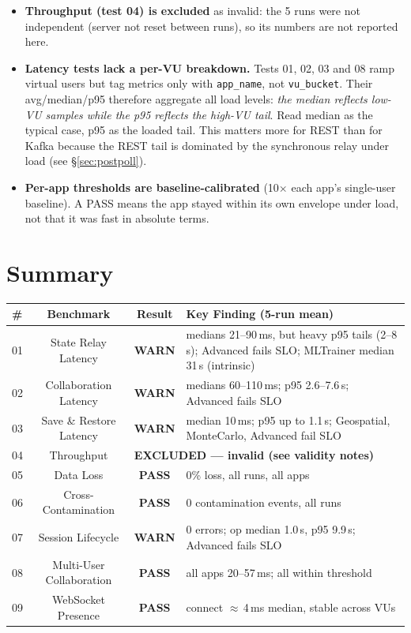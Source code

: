 \documentclass[11pt,a4paper]{article}
\newcommand{\pass}{\textcolor{pass}{\textbf{PASS}}}
\newcommand{\warn}{\textcolor{warn}{\textbf{WARN}}}
\begin{document}
\begin{itemize}
  \item \textbf{Throughput (test 04) is excluded} as invalid: the 5 runs were
        not independent (server not reset between runs), so its numbers are not
        reported here.
  \item \textbf{Latency tests lack a per-VU breakdown.} Tests 01, 02, 03 and
        08 ramp virtual users but tag metrics only with \texttt{app\_name},
        not \texttt{vu\_bucket}. Their avg/median/p95 therefore aggregate all
        load levels: \emph{the median reflects low-VU samples while the p95
        reflects the high-VU tail}. Read median as the typical case, p95 as the
        loaded tail. This matters more for REST than for Kafka because the REST
        tail is dominated by the synchronous relay under load (see
        \S\ref{sec:postpoll}).
  \item \textbf{Per-app thresholds are baseline-calibrated} (10$\times$ each
        app's single-user baseline). A PASS means the app stayed within its own
        envelope under load, not that it was fast in absolute terms.
\end{itemize}

\section{Summary}

\begin{tabularx}{\textwidth}{@{}lccX@{}}
\toprule
\textbf{\#} & \textbf{Benchmark} & \textbf{Result} & \textbf{Key Finding (5-run mean)} \\
\midrule
01 & State Relay Latency       & \warn & medians 21--90\,ms, but heavy p95 tails (2--8\,s); Advanced fails SLO; MLTrainer median 31\,s (intrinsic) \\
02 & Collaboration Latency     & \warn & medians 60--110\,ms; p95 2.6--7.6\,s; Advanced fails SLO \\
03 & Save \& Restore Latency   & \warn & median 10\,ms; p95 up to 1.1\,s; Geospatial, MonteCarlo, Advanced fail SLO \\
04 & Throughput                 & \multicolumn{2}{l}{\textbf{EXCLUDED — invalid (see validity notes)}} \\
05 & Data Loss                 & \pass & 0\% loss, all runs, all apps \\
06 & Cross-Contamination       & \pass & 0 contamination events, all runs \\
07 & Session Lifecycle          & \warn & 0 errors; op median 1.0\,s, p95 9.9\,s; Advanced fails SLO \\
08 & Multi-User Collaboration   & \pass & all apps 20--57\,ms; all within threshold \\
09 & WebSocket Presence         & \pass & connect $\approx$\,4\,ms median, stable across VUs \\
\bottomrule
\end{tabularx}
\end{document}
